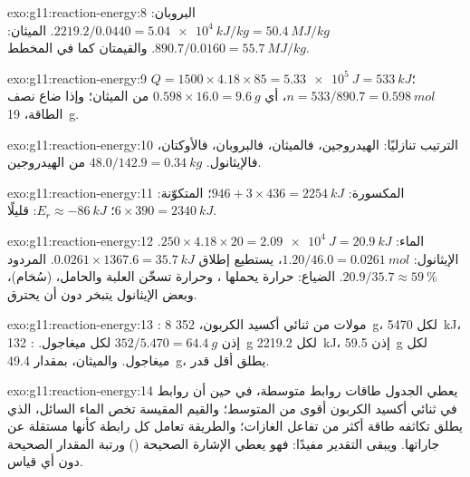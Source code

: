 \begin{solution}{exo:g11:reaction-energy:8}
البروبان: $2219.2 / 0.0440 = \qty{5.04e4}{kJ/kg} = \qty{50.4}{MJ/kg}$.
الميثان: $890.7 / 0.0160 = \qty{55.7}{MJ/kg}$. والقيمتان كما في المخطط.
\end{solution}

\begin{solution}{exo:g11:reaction-energy:9}
$Q = 1500 \times 4.18 \times 85 = \qty{5.33e5}{J} = \qty{533}{kJ}$؛
$n = 533 / 890.7 = \qty{0.598}{mol}$، أي $0.598 \times 16.0 =
\qty{9.6}{g}$ من الميثان؛ وإذا ضاع نصف الطاقة، \qty{19}{g}.
\end{solution}

\begin{solution}{exo:g11:reaction-energy:10}
الترتيب تنازليًا: الهيدروجين، فالميثان، فالبروبان، فالأوكتان، فالإيثانول.
$48.0 / 142.9 = \qty{0.34}{kg}$ من الهيدروجين.
\end{solution}

\begin{solution}{exo:g11:reaction-energy:11}
المكسورة: $946 + 3 \times 436 = \qty{2254}{kJ}$؛ المتكوّنة:
$6 \times 390 = \qty{2340}{kJ}$؛ $E_r \approx \qty{-86}{kJ}$: 
قليلًا.
\end{solution}

\begin{solution}{exo:g11:reaction-energy:12}
الماء: $250 \times 4.18 \times 20 = \qty{2.09e4}{J} = \qty{20.9}{kJ}$.
الإيثانول: $1.20 / 46.0 = \qty{0.0261}{mol}$، يستطيع إطلاق
$0.0261 \times 1367.6 = \qty{35.7}{kJ}$. المردود
$20.9 / 35.7 \approx \qty{59}{\percent}$. الضياع: حرارة يحملها
، وحرارة تسخّن العلبة والحامل،  (سُخام)،
وبعض الإيثانول يتبخر دون أن يحترق.
\end{solution}

\begin{solution}{exo:g11:reaction-energy:13}
: 8 مولات من ثنائي أكسيد الكربون،
\qty{352}{g}، لكل \qty{5470}{kJ}، إذن $352 / 5.470 = \qty{64.4}{g}$ لكل
ميغاجول. : \qty{132}{g} لكل
\qty{2219.2}{kJ}، إذن \qty{59.5}{g} لكل ميغاجول. والميثان، بمقدار
\qty{49.4}{g}، يطلق أقل قدر.
\end{solution}

\begin{solution}{exo:g11:reaction-energy:14}
يعطي الجدول طاقات روابط متوسطة، في حين أن روابط  في
ثنائي أكسيد الكربون أقوى من المتوسط؛ والقيم المقيسة تخص
الماء السائل، الذي يطلق تكاثفه طاقة أكثر من تفاعل
الغازات؛ والطريقة تعامل كل رابطة كأنها مستقلة عن
جاراتها. ويبقى التقدير مفيدًا: فهو يعطي الإشارة الصحيحة
() ورتبة المقدار الصحيحة دون أي قياس.
\end{solution}

